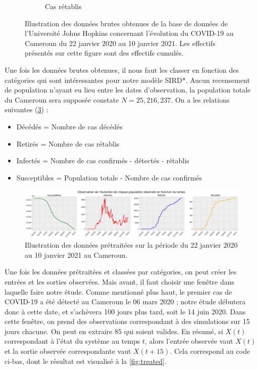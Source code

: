 \documentclass[
  french,
	10pt, %
]{fphw}
\begin{document}
\begin{figure}[H]
\begin{subfigure}{0.32\textwidth}
	  \caption{Cas rétablis}
  \label{fig:recovered}
	\end{subfigure}
	\caption{Illustration des données brutes obtenues de la base de données de l'Université Johns Hopkins concernant l'évolution du COVID-19 au Cameroun du 22 janvier 2020 au 10 janvier 2021. Les effectifs présentés sur cette figure sont des effectifs cumulés.}
	\label{fig:RawData}
\end{figure}
 Une fois les données brutes obtenues, il nous faut les classer en fonction des catégories qui sont intéressantes pour notre modèle SIRD*. Aucun recensement de population n'ayant eu lieu entre les dates d'observation, la population totale du Cameroun sera supposée constate $N=25,216,237$. On a les relations suivantes (\cref{fig:pretreated}) :
 \begin{itemize}
   \item Décédés = Nombre de cas décédés
   \item Retirés = Nombre de cas rétablis
   \item Infectés = Nombre de cas confirmés - détectés - rétablis
   \item Susceptibles = Population totale - Nombre de cas confirmés
 \end{itemize} 

\begin{figure}[H]
  \centering
  \includegraphics[width=\linewidth]{pretreated.png}
  \caption{Illustration des données prétraitées sur la période du 22 janvier 2020 au 10 janvier 2021 au Cameroun.}
  \label{fig:pretreated}
\end{figure}

Une fois les données prétraitées et classées par catégories, on peut créer les entrées et les sorties observées. Mais avant, il faut choisir une fenêtre dans laquelle faire notre étude. Comme mentionné plus haut, le premier cas de COVID-19 a été détecté au Cameroun le 06 mars 2020 ; notre étude débutera donc à cette date, et s'achèvera 100 jours plus tard, soit le 14 juin 2020. Dans cette fenêtre, on prend des observations correspondant à des simulations sur 15 jours chacune. On peut en extraire 85 qui soient valides. En résumé, si $X(t)$ correspondant à l'état du système au temps $t$, alors l'entrée observée vaut $X(t)$ et la sortie observée correspondante vaut $X(t+15)$. Cela correspond au code ci-bas, dont le résultat est visualisé à la \cref{fig:treated}.
\end{document}
